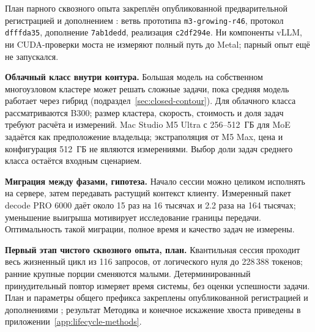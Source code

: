План парного сквозного опыта закреплён опубликованной предварительной регистрацией
и дополнением \cite{growingReplayPrereg}: ветвь прототипа \texttt{m3-growing-r46},
протокол \texttt{dfffda35}, дополнение \texttt{7ab1dedd}, реализация \texttt{c2df294e}.
Ни компоненты vLLM, ни CUDA-проверки моста не измеряют полный путь до Metal; парный опыт ещё не запускался.

\textbf{Облачный класс внутри контура.} Большая модель на собственном многоузловом кластере
может решать сложные задачи, пока средняя модель работает через гибрид
(подраздел~\ref{sec:closed-contour}). Для облачного класса рассматриваются B300;
размер кластера, скорость, стоимость и доля задач требуют расчёта и измерений.
Mac Studio M5 Ultra с 256--512~ГБ для MoE задаётся как предположение владельца;
экстраполяция от M5 Max, цена и конфигурация 512~ГБ не являются измерениями.
Выбор доли задач среднего класса остаётся входным сценарием.

\textbf{Миграция между фазами, гипотеза.} Начало сессии можно целиком исполнять на сервере,
затем передавать растущий контекст клиенту. Измеренный пакет decode PRO 6000 даёт около 15 раз на 16 тысячах
и 2.2 раза на 164 тысячах; уменьшение выигрыша мотивирует исследование границы передачи.
Оптимальность такой миграции, полное время и качество задач не измерены.

\textbf{Первый этап чистого сквозного опыта, план.} Квантильная сессия проходит весь жизненный цикл
из 116 запросов, от логического нуля до 228\,388 токенов; ранние крупные порции сменяются малыми.
Детерминированный принудительный повтор измеряет время системы, без оценки успешности задачи.
План и параметры общего префикса закреплены опубликованной регистрацией и дополнениями \cite{growingReplayPrereg};
результат 
Методика и конечное искажение хвоста приведены в приложении~\ref{app:lifecycle-methods}.
